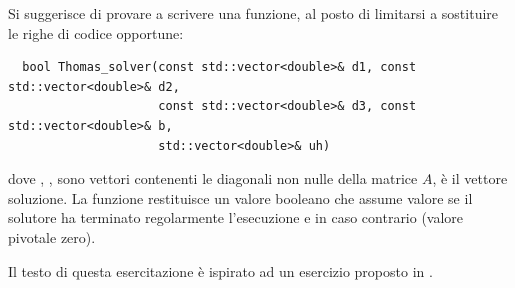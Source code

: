 Si suggerisce di provare a scrivere una funzione, al posto di limitarsi a
sostituire le righe di codice opportune:

\lstset{basicstyle=\scriptsize\sf}
\begin{lstlisting}
  bool Thomas_solver(const std::vector<double>& d1, const std::vector<double>& d2, 
                     const std::vector<double>& d3, const std::vector<double>& b, 
                     std::vector<double>& uh)
\end{lstlisting}
\lstset{basicstyle=\sf}

dove , ,  sono vettori contenenti le diagonali 
non nulle della matrice $A$,  \`e il vettore soluzione. La funzione
restituisce un valore booleano che assume valore  se il solutore ha 
terminato regolarmente l'esecuzione e  in caso contrario (valore pivotale zero).  
 
Il testo di questa esercitazione \`e ispirato ad un esercizio proposto in \cite{Hecht.Danalia.ea:2003}.

